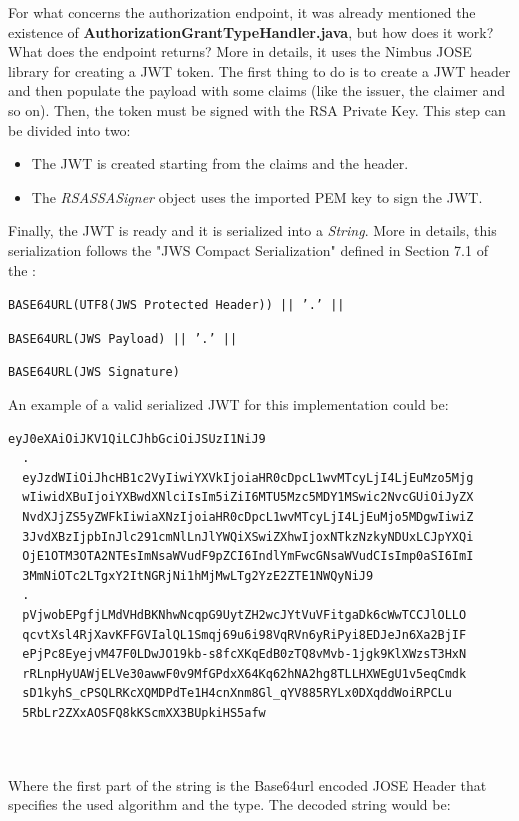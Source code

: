 For what concerns the authorization endpoint, it was already mentioned the existence of \textbf{AuthorizationGrantTypeHandler.java}, but how does it work? What does the endpoint returns? More in details, it uses the Nimbus JOSE library for creating a JWT token. The first thing to do is to create a JWT header and then populate the payload with some claims (like the issuer, the claimer and so on). Then, the token must be signed with the RSA Private Key. This step can be divided into two: 

\begin{itemize}
    \item The JWT is created starting from the claims and the header.
    \item The \textit{RSASSASigner} object uses the imported PEM key to sign the JWT.
\end{itemize}

\noindent Finally, the JWT is ready and it is serialized into a \textit{String}. More in details, this serialization follows the "JWS Compact Serialization" defined in Section 7.1 of the  \cite{RFC7515}:

  \texttt{BASE64URL(UTF8(JWS Protected Header)) || '.' ||}
  
  \texttt{BASE64URL(JWS Payload) || '.' ||}
  
  \texttt{BASE64URL(JWS Signature)}

\noindent An example of a valid serialized JWT for this implementation could be:

\begin{lstlisting}[basicstyle=\ttfamily]
  eyJ0eXAiOiJKV1QiLCJhbGciOiJSUzI1NiJ9
  .
  eyJzdWIiOiJhcHB1c2VyIiwiYXVkIjoiaHR0cDpcL1wvMTcyLjI4LjEuMzo5Mjg
  wIiwidXBuIjoiYXBwdXNlciIsIm5iZiI6MTU5Mzc5MDY1MSwic2NvcGUiOiJyZX
  NvdXJjZS5yZWFkIiwiaXNzIjoiaHR0cDpcL1wvMTcyLjI4LjEuMjo5MDgwIiwiZ
  3JvdXBzIjpbInJlc291cmNlLnJlYWQiXSwiZXhwIjoxNTkzNzkyNDUxLCJpYXQi
  OjE1OTM3OTA2NTEsImNsaWVudF9pZCI6IndlYmFwcGNsaWVudCIsImp0aSI6ImI
  3MmNiOTc2LTgxY2ItNGRjNi1hMjMwLTg2YzE2ZTE1NWQyNiJ9
  .
  pVjwobEPgfjLMdVHdBKNhwNcqpG9UytZH2wcJYtVuVFitgaDk6cWwTCCJlOLLO
  qcvtXsl4RjXavKFFGVIalQL1Smqj69u6i98VqRVn6yRiPyi8EDJeJn6Xa2BjIF
  ePjPc8EyejvM47F0LDwJO19kb-s8fcXKqEdB0zTQ8vMvb-1jgk9KlXWzsT3HxN
  rRLnpHyUAWjELVe30awwF0v9MfGPdxX64Kq62hNA2hg8TLLHXWEgU1v5eqCmdk
  sD1kyhS_cPSQLRKcXQMDPdTe1H4cnXnm8Gl_qYV885RYLx0DXqddWoiRPCLu
  5RbLr2ZXxAOSFQ8kKScmXX3BUpkiHS5afw

  
\end{lstlisting}

\noindent Where the first part of the string is the Base64url encoded JOSE Header that specifies the used algorithm and the type. The decoded string would be:

